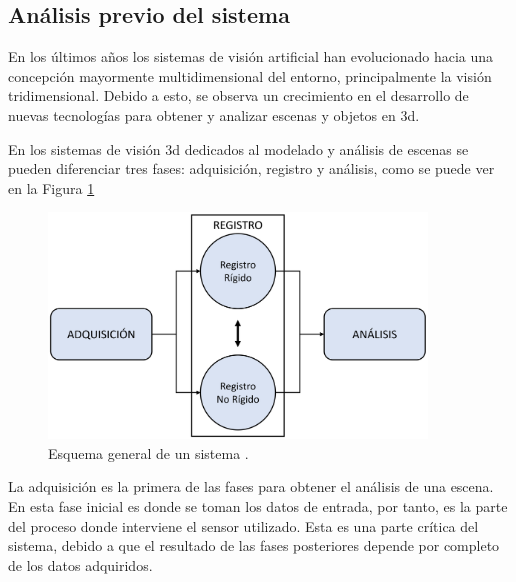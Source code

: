 
\subsection{Análisis previo del sistema}
En los últimos años los sistemas de visión artificial han evolucionado hacia una concepción mayormente multidimensional del entorno, principalmente la visión tridimensional.
Debido a esto, se observa un crecimiento en el desarrollo de nuevas tecnologías para obtener y analizar escenas y objetos en \gls{3d}.

En los sistemas de visión \gls{3d} dedicados al modelado y análisis de escenas se pueden diferenciar tres fases: adquisición, registro y análisis, como se puede ver en la Figura \ref{fig:adquisicion-registro-analisis}

\begin{figure}[h]
    \centering
    \includegraphics[height=6cm]{archivos/adquisicion-registro-analisis.png}
    \caption{Esquema general de un sistema .}
    \label{fig:adquisicion-registro-analisis}
\end{figure}

La adquisición es la primera de las fases para obtener el análisis de una escena.
En esta fase inicial es donde se toman los datos de entrada, por tanto, es la parte del proceso donde interviene el sensor utilizado.
Esta es una parte crítica del sistema, debido a que el resultado de las fases posteriores depende por completo de los datos adquiridos.

